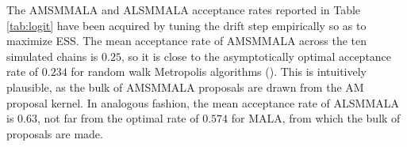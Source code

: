 \documentclass[twoside,11pt]{article}
\begin{document}
The AMSMMALA and ALSMMALA acceptance rates reported in Table \ref{tab:logit} have been acquired by tuning the drift step 
empirically so as to maximize ESS. The mean acceptance rate of AMSMMALA across the ten simulated chains is $0.25$, so it is 
close to the asymptotically optimal acceptance rate of $0.234$ for random walk Metropolis algorithms 
(\cite{rob_gel_gil__wea}). This is intuitively plausible, as the bulk of AMSMMALA proposals are drawn from the AM proposal 
kernel. In analogous fashion, the mean acceptance rate of ALSMMALA is $0.63$, not far from the optimal rate of $0.574$ for
MALA, from which the bulk of proposals are made.

\begin{figure}[t]
	\centering
	 \\
\end{figure}
\end{document}
